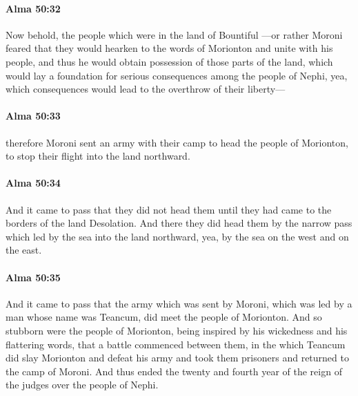 		\paragraph{Alma 50:32} %
			\label{ALMA-50-32}

			Now behold, the people which were in the land of Bountiful
			---or rather Moroni feared
			that they would hearken to the words of Morionton and unite with his people,
			and thus he would obtain possession of those parts of the land,
			which would lay a foundation for serious consequences
			among the people of Nephi,
			yea, which consequences would lead to the overthrow of their liberty---

		\paragraph{Alma 50:33} %
			\label{ALMA-50-33}

			therefore Moroni sent an army with their camp to head the people of Morionton,
			to stop their flight into the land northward.

		\paragraph{Alma 50:34} %
			\label{ALMA-50-34}

			And it came to pass that they did not head them
			until they had came to the borders of the land Desolation.
			And there they did head them by the narrow pass
			which led by the sea into the land northward,
			yea, by the sea on the west and on the east.

		\paragraph{Alma 50:35} %
			\label{ALMA-50-35}

			And it came to pass that the army which was sent by Moroni,
			which was led by a man whose name was Teancum,
			did meet the people of Morionton.
			And so stubborn were the people of Morionton,
			being inspired by his wickedness and his flattering words,
			that a battle commenced between them,
			in the which Teancum did slay Morionton and defeat his army
			and took them prisoners and returned to the camp of Moroni.
			And thus ended the twenty and fourth year
			of the reign of the judges over the people of Nephi.

